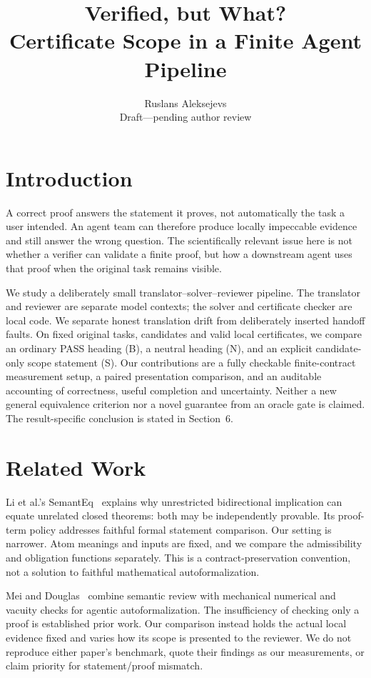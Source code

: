 \documentclass[10pt]{article}
\title{Verified, but What?\\Certificate Scope in a Finite Agent Pipeline}
\author{Ruslans Aleksejevs\\\small Draft---pending author review}
\date{\ReportDate}
\begin{document}
\maketitle
\begin{abstract}
\RunAbstract
\end{abstract}

\section{Introduction}
A correct proof answers the statement it proves, not automatically the task a
user intended. An agent team can therefore produce locally impeccable evidence
and still answer the wrong question. The scientifically relevant issue here is
not whether a verifier can validate a finite proof, but how a downstream agent
uses that proof when the original task remains visible.

We study a deliberately small translator--solver--reviewer pipeline. The
translator and reviewer are separate model contexts; the solver and certificate
checker are local code. We separate honest translation drift from deliberately
inserted handoff faults. On fixed original tasks, candidates and valid local
certificates, we compare an ordinary PASS heading (B), a neutral heading (N), and
an explicit candidate-only scope statement (S). Our contributions are a fully
checkable finite-contract measurement setup, a paired presentation comparison,
and an auditable accounting of correctness, useful completion and uncertainty.
Neither a new general equivalence criterion nor a novel guarantee from an oracle
gate is claimed. The result-specific conclusion is stated in Section~6.

\section{Related Work}
Li et al.'s SemantEq~\cite{semanteq} explains why unrestricted bidirectional
implication can equate unrelated closed theorems: both may be independently
provable. Its proof-term policy addresses faithful formal statement comparison.
Our setting is narrower. Atom meanings and inputs are fixed, and we compare the
admissibility and obligation functions separately. This is a contract-preservation
convention, not a solution to faithful mathematical autoformalization.

Mei and Douglas~\cite{mechanical} combine semantic review with mechanical
numerical and vacuity checks for agentic autoformalization. The insufficiency of
checking only a proof is established prior work. Our comparison instead holds
the actual local evidence fixed and varies how its scope is presented to the
reviewer. We do not reproduce either paper's benchmark, quote their findings as
our measurements, or claim priority for statement/proof mismatch.
\end{document}
